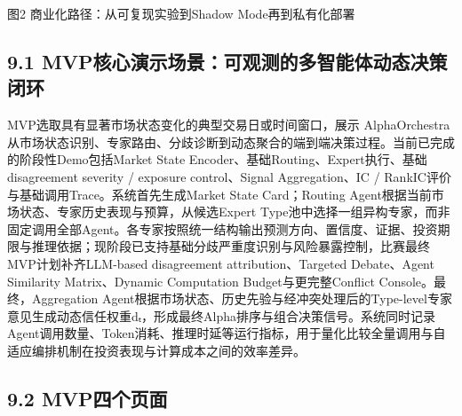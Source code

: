 \documentclass[12pt,a4paper]{ctexart}
\begin{document}
图2 商业化路径：从可复现实验到Shadow Mode再到私有化部署

\subsection{\texorpdfstring{\textbf{9.1
MVP核心演示场景：可观测的多智能体动态决策闭环}}{9.1 MVP核心演示场景：可观测的多智能体动态决策闭环}}\label{mvpux6838ux5fc3ux6f14ux793aux573aux666fux53efux89c2ux6d4bux7684ux591aux667aux80fdux4f53ux52a8ux6001ux51b3ux7b56ux95edux73af}

MVP选取具有显著市场状态变化的典型交易日或时间窗口，展示 AlphaOrchestra
从市场状态识别、专家路由、分歧诊断到动态聚合的端到端决策过程。当前已完成的阶段性Demo包括Market
State Encoder、基础Routing、Expert执行、基础disagreement severity /
exposure control、Signal Aggregation、IC /
RankIC评价与基础调用Trace。系统首先生成Market State Card；Routing
Agent根据当前市场状态、专家历史表现与预算，从候选Expert
Type池中选择一组异构专家，而非固定调用全部Agent。各专家按照统一结构输出预测方向、置信度、证据、投资期限与推理依据；现阶段已支持基础分歧严重度识别与风险暴露控制，比赛最终MVP计划补齐LLM-based
disagreement attribution、Targeted Debate、Agent Similarity
Matrix、Dynamic Computation Budget与更完整Conflict
Console。最终，Aggregation
Agent根据市场状态、历史先验与经冲突处理后的Type-level专家意见生成动态信任权重dₜ，形成最终Alpha排序与组合决策信号。系统同时记录Agent调用数量、Token消耗、推理时延等运行指标，用于量化比较全量调用与自适应编排机制在投资表现与计算成本之间的效率差异。

\subsection{\texorpdfstring{\textbf{9.2
MVP四个页面}}{9.2 MVP四个页面}}\label{mvpux56dbux4e2aux9875ux9762}
\end{document}
